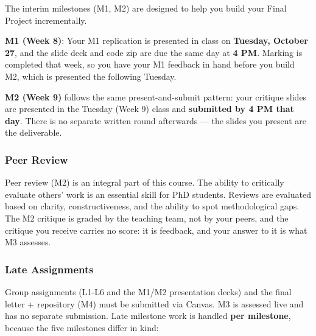 \documentclass[
]{article}
\begin{document}
The interim milestones (M1, M2) are designed to help you build your
Final Project incrementally.

\textbf{M1 (Week 8)}: Your M1 replication is presented in class on
\textbf{Tuesday, October 27}, and the slide deck and code zip are due
the same day at \textbf{4 PM}. Marking is completed that week, so you
have your M1 feedback in hand before you build M2, which is presented
the following Tuesday.

\textbf{M2 (Week 9)} follows the same present-and-submit pattern: your
critique slides are presented in the Tuesday (Week 9) class and
\textbf{submitted by 4 PM that day}. There is no separate written round
afterwards --- the slides you present are the deliverable.

\subsubsection{Peer Review}\label{peer-review}

Peer review (M2) is an integral part of this course. The ability to
critically evaluate others' work is an essential skill for PhD students.
Reviews are evaluated based on clarity, constructiveness, and the
ability to spot methodological gaps. The M2 critique is graded by the
teaching team, not by your peers, and the critique you receive carries
no score: it is feedback, and your answer to it is what M3 assesses.

\subsubsection{Late Assignments}\label{late-assignments}

Group assignments (L1-L6 and the M1/M2 presentation decks) and the final
letter + repository (M4) must be submitted via Canvas. M3 is assessed
live and has no separate submission. Late milestone work is handled
\textbf{per milestone}, because the five milestones differ in kind:
\end{document}
